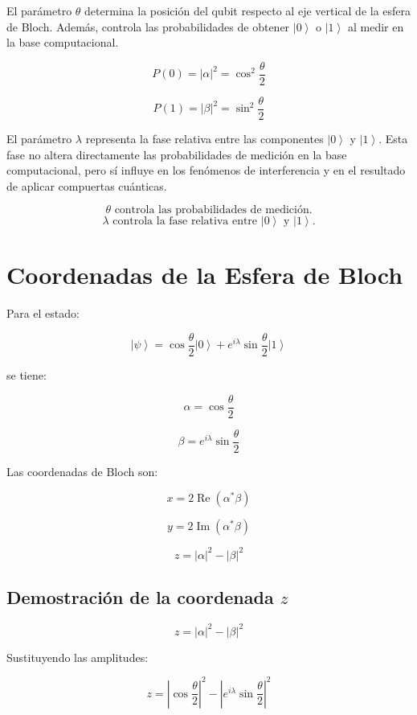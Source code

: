\documentclass[12pt,a4paper]{article}
\newcommand{\ket}[1]{\left|#1\right\rangle}
\begin{document}
El parámetro \(\theta\) determina la posición del qubit respecto al eje vertical de la esfera de Bloch. Además, controla las probabilidades de obtener \(\ket{0}\) o \(\ket{1}\) al medir en la base computacional.

\[
P(0)=|\alpha|^2=\cos^2\frac{\theta}{2}
\]

\[
P(1)=|\beta|^2=\sin^2\frac{\theta}{2}
\]

El parámetro \(\lambda\) representa la fase relativa entre las componentes \(\ket{0}\) y \(\ket{1}\). Esta fase no altera directamente las probabilidades de medición en la base computacional, pero sí influye en los fenómenos de interferencia y en el resultado de aplicar compuertas cuánticas.

\begin{resultado}
\[
\theta \text{ controla las probabilidades de medición.}
\]
\[
\lambda \text{ controla la fase relativa entre } \ket{0} \text{ y } \ket{1}.
\]
\end{resultado}

\section{Coordenadas de la Esfera de Bloch}

Para el estado:

\[
\ket{\psi}=\cos\frac{\theta}{2}\ket{0}+e^{i\lambda}\sin\frac{\theta}{2}\ket{1}
\]

se tiene:

\[
\alpha=\cos\frac{\theta}{2}
\]

\[
\beta=e^{i\lambda}\sin\frac{\theta}{2}
\]

Las coordenadas de Bloch son:

\[
x=2\operatorname{Re}(\alpha^*\beta)
\]

\[
y=2\operatorname{Im}(\alpha^*\beta)
\]

\[
z=|\alpha|^2-|\beta|^2
\]

\subsection{Demostración de la coordenada \texorpdfstring{$z$}{z}}

\[
z=|\alpha|^2-|\beta|^2
\]

Sustituyendo las amplitudes:

\[
z=
\left|\cos\frac{\theta}{2}\right|^2
-
\left|e^{i\lambda}\sin\frac{\theta}{2}\right|^2
\]
\end{document}
